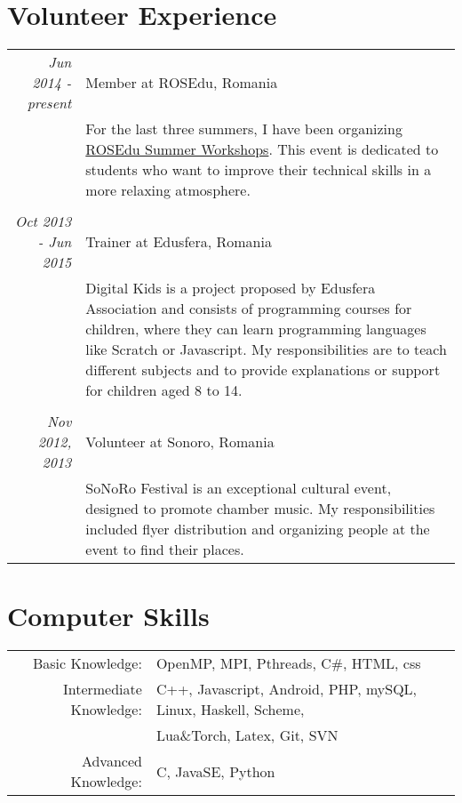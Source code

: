 \documentclass[a4paper,10pt]{article} %
\begin{document}
\section{Volunteer Experience}
\begin{tabular}{r|p{11cm}}

\emph{Jun 2014 - present} & Member at ROSEdu, Romania\\
& \footnotesize{For the last three summers, I have been organizing \href{http://workshop.rosedu.org/}{ROSEdu Summer Workshops}. This event is dedicated to students who want to improve their technical skills in a more relaxing atmosphere.}\\
\multicolumn{2}{c}{} \\


\emph{Oct 2013 - Jun 2015} & Trainer at Edusfera, Romania \\
& \footnotesize{Digital Kids is a project proposed by Edusfera Association and consists of programming courses for children, where they can learn programming languages like Scratch or Javascript. My responsibilities are to teach different subjects and to provide explanations or support for children aged 8 to 14.}\\
\multicolumn{2}{c}{} \\


\emph{Nov 2012, 2013} & Volunteer at Sonoro, Romania\\
& \footnotesize{SoNoRo Festival is an exceptional cultural event, designed to promote chamber music. My responsibilities included flyer distribution and organizing people at the event to find their places.}
\end{tabular}




\section{Computer Skills}

\begin{tabular}{rl}
Basic Knowledge: & OpenMP, MPI, Pthreads, C\#, HTML, css\\

Intermediate Knowledge: & C++, Javascript, Android, PHP, mySQL, Linux, Haskell, Scheme,\\
& Lua\&Torch, Latex, Git, SVN\\ 
Advanced Knowledge: & C, JavaSE, Python\\
\end{tabular}
\end{document}
